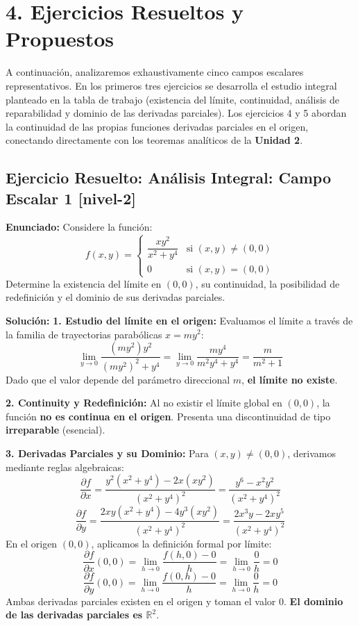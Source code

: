 \documentclass[11pt]{article}
\newenvironment{ejercicios}{%
  \section*{4. Ejercicios Resueltos y Propuestos}%
}{}
\newenvironment{ejercicioresuelto}[2]{\subsection*{Ejercicio Resuelto: #1 \small{[#2]}}}{}
\newcommand{\enunciado}[1]{\textbf{Enunciado:} #1\par\vspace{0.2cm}}
\newcommand{\solucion}[1]{\textbf{Solución:} #1\par\vspace{0.4cm}}
\begin{document}
\begin{ejercicios}
  A continuación, analizaremos exhaustivamente cinco campos escalares representativos. En los primeros tres ejercicios se desarrolla el estudio integral planteado en la tabla de trabajo (existencia del límite, continuidad, análisis de reparabilidad y dominio de las derivadas parciales). Los ejercicios 4 y 5 abordan la continuidad de las propias funciones derivadas parciales en el origen, conectando directamente con los teoremas analíticos de la \textbf{Unidad 2}.

  \begin{ejercicioresuelto}{Análisis Integral: Campo Escalar 1}{nivel-2}
    \enunciado{
      Considere la función:
      $$ f(x,y) = \begin{cases} \displaystyle \dfrac{xy^2}{x^2 + y^4} & \text{si } (x,y) \neq (0,0) \\[1em] 0 & \text{si } (x,y) = (0,0) \end{cases} $$
      Determine la existencia del límite en $(0,0)$, su continuidad, la posibilidad de redefinición y el dominio de sus derivadas parciales.
    }
    \solucion{
      \textbf{1. Estudio del límite en el origen:} 
      Evaluamos el límite a través de la familia de trayectorias parabólicas $x = my^2$:
      $$ \displaystyle \lim\limits_{y \to 0} \displaystyle \dfrac{(my^2)y^2}{(my^2)^2 + y^4} = \displaystyle \lim\limits_{y \to 0} \displaystyle \dfrac{my^4}{m^2y^4 + y^4} = \displaystyle \dfrac{m}{m^2 + 1} $$
      Dado que el valor depende del parámetro direccional $m$, \textbf{el límite no existe}.
      
      \textbf{2. Continuity y Redefinición:}
      Al no existir el límite global en $(0,0)$, la función \textbf{no es continua en el origen}. Presenta una discontinuidad de tipo \textbf{irreparable} (esencial).
      
      \textbf{3. Derivadas Parciales y su Dominio:}
      Para $(x,y) \neq (0,0)$, derivamos mediante reglas algebraicas:
      $$ \displaystyle \dfrac{\partial f}{\partial x} = \displaystyle \dfrac{y^2(x^2+y^4) - 2x(xy^2)}{(x^2+y^4)^2} = \displaystyle \dfrac{y^6 - x^2 y^2}{(x^2+y^4)^2} $$
      $$ \displaystyle \dfrac{\partial f}{\partial y} = \displaystyle \dfrac{2xy(x^2+y^4) - 4y^3(xy^2)}{(x^2+y^4)^2} = \displaystyle \dfrac{2x^3 y - 2xy^5}{(x^2+y^4)^2} $$
      En el origen $(0,0)$, aplicamos la definición formal por límite:
      $$ \displaystyle \dfrac{\partial f}{\partial x}(0,0) = \displaystyle \lim\limits_{h \to 0} \displaystyle \dfrac{f(h,0) - 0}{h} = \displaystyle \lim\limits_{h \to 0} \displaystyle \dfrac{0}{h} = 0 $$
      $$ \displaystyle \dfrac{\partial f}{\partial y}(0,0) = \displaystyle \lim\limits_{h \to 0} \displaystyle \dfrac{f(0,h) - 0}{h} = \displaystyle \lim\limits_{h \to 0} \displaystyle \dfrac{0}{h} = 0 $$
      Ambas derivadas parciales existen en el origen y toman el valor $0$. \textbf{El dominio de las derivadas parciales es $\mathbb{R}^2$}.
    }
  \end{ejercicioresuelto}


\end{ejercicios}
\end{document}
